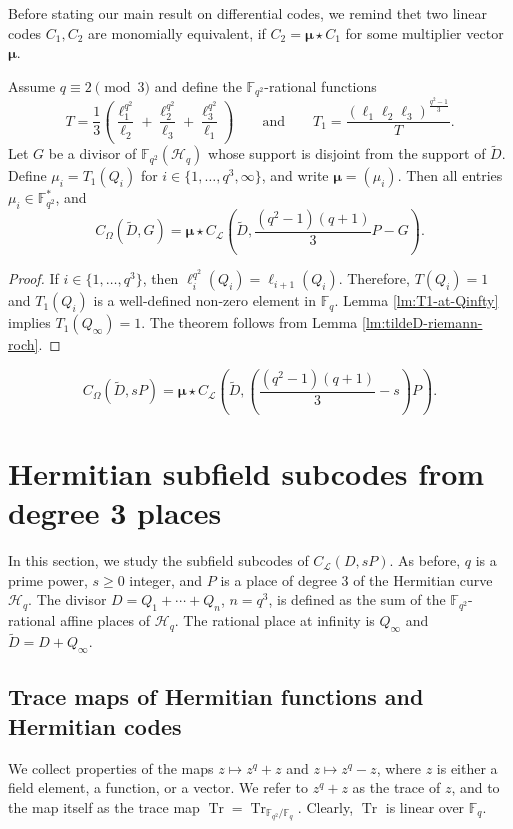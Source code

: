 \documentclass[entropy,article,submit,pdftex,moreauthors]{Definitions/mdpi}
\DeclareMathOperator{\trace}{Tr}
\begin{document}
Before stating our main result on differential codes, we remind thet two linear codes $C_1,C_2$ are monomially equivalent, if $C_2=\boldsymbol{\mu} \star C_1$ for some multiplier vector $\boldsymbol{\mu}$. 

\begin{Theorem}
Assume $q\equiv 2 \pmod3$ and define the $\mathbb{F}_{q^2}$-rational functions 
\[T=\frac{1}{3}\left(\frac{\ell_1^{q^2}}{\ell_2} + \frac{\ell_2^{q^2}}{\ell_3} + \frac{\ell_3^{q^2}}{\ell_1}\right) \qquad \text{and} \qquad T_1=\frac{(\ell_1\ell_{2}\ell_{3})^{\frac{q^2-1}{3}}}{T}.\]
Let $G$ be a divisor of $\mathbb{F}_{q^2}(\mathscr{H}_q)$ whose support is disjoint from the support of $\widetilde{D}$. Define $\mu_i=T_1(Q_i)$ for $i \in \{1,\ldots,q^3,\infty\}$, and write $\boldsymbol{\mu}=(\mu_i)$. Then all entries $\mu_i\in \mathbb{F}_{q^2}^*$, and
\[C_\Omega(\widetilde{D},G) = \boldsymbol{\mu} \star C_\mathscr{L}(\widetilde{D},\frac{(q^2-1)(q+1)}{3}P-G).\]
\end{Theorem}
\begin{proof}
If $i\in \{1,\ldots,q^3\}$, then $\ell_i^{q^2}(Q_i)=\ell_{i+1}(Q_i)$. Therefore, $T(Q_i)=1$ and $T_1(Q_i)$ is a well-defined non-zero element in $\mathbb{F}_q$. Lemma \ref{lm:T1-at-Qinfty} implies $T_1(Q_\infty)=1$. The theorem follows from Lemma \ref{lm:tildeD-riemann-roch}. 
\end{proof}

\begin{Corollary}
\[C_\Omega(\widetilde{D},sP) = \boldsymbol{\mu} \star C_\mathcal{L}\left(\widetilde{D},\left(\frac{(q^2-1)(q+1)}{3}-s\right)P\right).\]
\end{Corollary}



\section{Hermitian subfield subcodes from degree 3 places \label{sec:subf}}

In this section, we study the subfield subcodes of $C_\mathcal{L}(D,sP)$. As before, $q$ is a prime power, $s\geq 0$ integer, and $P$ is a place of degree $3$ of the Hermitian curve $\mathscr{H}_q$. The divisor $D=Q_1+\cdots+Q_{n}$, $n=q^3$, is defined as the sum of the $\mathbb{F}_{q^2}$-rational affine places of $\mathscr{H}_q$. The rational place at infinity is $Q_\infty$ and $\widetilde{D}=D+Q_\infty$. 

\subsection{Trace maps of Hermitian functions and Hermitian codes}
We collect properties of the maps $z\mapsto z^q+z$ and $z\mapsto z^q-z$, where $z$ is either a field element, a function, or a vector. We refer to $z^q+z$ as the trace of $z$, and to the map itself as the trace map $\trace = \trace_{\mathbb{F}_{q^2} / \mathbb{F}_q}$. Clearly, $\trace$ is linear over $\mathbb{F}_q$. 
\end{document}
